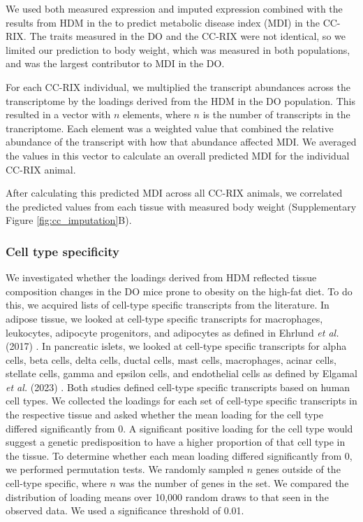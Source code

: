 \documentclass[
]{article}
\begin{document}
We used both measured expression and imputed expression combined with
the results from HDM in the to predict metabolic disease index (MDI) in
the CC-RIX. The traits measured in the DO and the CC-RIX were not
identical, so we limited our prediction to body weight, which was
measured in both populations, and was the largest contributor to MDI in
the DO.

For each CC-RIX individual, we multiplied the transcript abundances
across the transcriptome by the loadings derived from the HDM in the DO
population. This resulted in a vector with \(n\) elements, where \(n\)
is the number of transcripts in the trancriptome. Each element was a
weighted value that combined the relative abundance of the transcript
with how that abundance affected MDI. We averaged the values in this
vector to calculate an overall predicted MDI for the individual CC-RIX
animal.

After calculating this predicted MDI across all CC-RIX animals, we
correlated the predicted values from each tissue with measured body
weight (Supplementary Figure \ref{fig:cc_imputation}B).

\subsubsection{Cell type specificity}\label{cell-type-specificity}

We investigated whether the loadings derived from HDM reflected tissue
composition changes in the DO mice prone to obesity on the high-fat
diet. To do this, we acquired lists of cell-type specific transcripts
from the literature. In adipose tissue, we looked at cell-type specific
transcripts for macrophages, leukocytes, adipocyte progenitors, and
adipocytes as defined in Ehrlund \textit{et al.} (2017)
\cite{pmid29087381}. In pancreatic islets, we looked at cell-type
specific transcripts for alpha cells, beta cells, delta cells, ductal
cells, mast cells, macrophages, acinar cells, stellate cells, gamma and
epsilon cells, and endothelial cells as defined by Elgamal
\textit{et al.} (2023) \cite{pmid36778506}. Both studies defined
cell-type specific transcripts based on human cell types. We collected
the loadings for each set of cell-type specific transcripts in the
respective tissue and asked whether the mean loading for the cell type
differed significantly from 0. A significant positive loading for the
cell type would suggest a genetic predisposition to have a higher
proportion of that cell type in the tissue. To determine whether each
mean loading differed significantly from 0, we performed permutation
tests. We randomly sampled \(n\) genes outside of the cell-type
specific, where \(n\) was the number of genes in the set. We compared
the distribution of loading means over 10,000 random draws to that seen
in the observed data. We used a significance threshold of 0.01.
\end{document}
